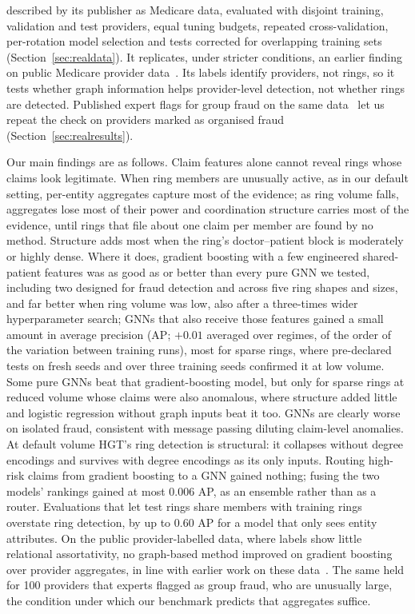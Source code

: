 \documentclass[pdflatex,sn-vancouver-num]{sn-jnl}
\begin{document}
\begin{enumerate}
  described by its publisher as Medicare data, evaluated with disjoint training,
  validation and test providers, equal tuning budgets, repeated
  cross-validation, per-rotation model selection and tests corrected for
  overlapping training sets (Section~\ref{sec:realdata}). It replicates, under stricter conditions, an
  earlier finding on public Medicare provider data~\cite{yoo2023}. Its labels
  identify providers, not rings, so it tests whether graph information helps
  provider-level detection, not whether rings are detected. Published expert
  flags for group fraud on the same data~\cite{ma2023rdpgl} let us repeat the
  check on providers marked as organised fraud (Section~\ref{sec:realresults}).
\end{enumerate}

Our main findings are as follows. Claim features alone cannot reveal rings
whose claims look legitimate. When ring members are unusually active, as in
our default setting, per-entity aggregates capture most of the evidence; as
ring volume falls, aggregates lose most of their power and coordination
structure carries most of the evidence, until rings that file about one claim
per member are found by no method. Structure adds most when the ring's
doctor--patient block is moderately or highly dense. Where it does, gradient boosting with a few
engineered shared-patient features was as good as or better than every pure
GNN we tested, including two designed for fraud detection and across five ring
shapes and sizes, and far better when ring volume was low, also after a
three-times wider hyperparameter search; GNNs that also receive
those features gained a small amount in average precision (AP; $+0.01$
averaged over regimes, of the order of the variation between training runs),
most for sparse rings, where pre-declared tests on fresh seeds and over three
training seeds confirmed it at low volume. Some pure GNNs beat that gradient-boosting model, but only for sparse
rings at reduced volume whose claims were also anomalous, where structure
added little and logistic regression without graph inputs beat it too. GNNs are clearly worse
on isolated fraud, consistent with message passing diluting claim-level anomalies. At
default volume HGT's ring detection is structural: it collapses without degree
encodings and survives with degree encodings as its only inputs. Routing
high-risk claims from gradient boosting to a GNN gained nothing; fusing the
two models' rankings gained at most 0.006 AP, as an ensemble rather than as a
router. Evaluations that let test rings share members with training rings
overstate ring detection, by up to 0.60 AP for a model that only sees entity
attributes. On the public provider-labelled data, where labels show little
relational assortativity, no graph-based method improved on gradient boosting
over provider aggregates, in line with earlier work on these
data~\cite{yoo2023}. The same held for 100 providers that experts flagged as
group fraud, who are unusually large, the condition under which our benchmark
predicts that aggregates suffice.
\end{document}
